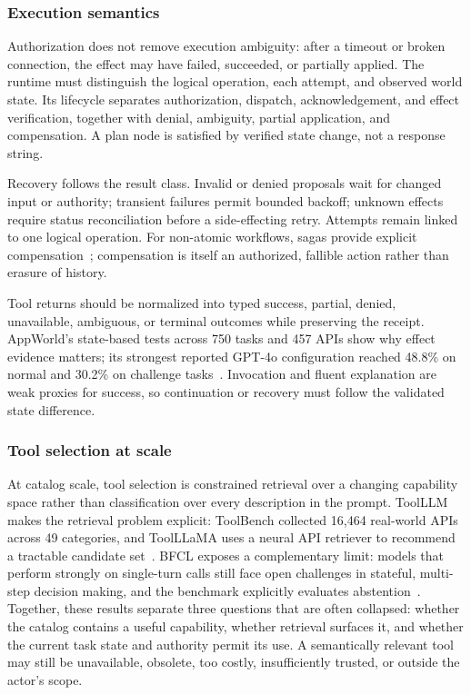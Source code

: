 \subsubsection{Execution semantics}

Authorization does not remove execution ambiguity: after a timeout or broken connection, the effect may have failed, succeeded, or partially applied. The runtime must distinguish the logical operation, each attempt, and observed world state. Its lifecycle separates authorization, dispatch, acknowledgement, and effect verification, together with denial, ambiguity, partial application, and compensation. A plan node is satisfied by verified state change, not a response string.

Recovery follows the result class. Invalid or denied proposals wait for changed input or authority; transient failures permit bounded backoff; unknown effects require status reconciliation before a side-effecting retry. Attempts remain linked to one logical operation. For non-atomic workflows, sagas provide explicit compensation~\cite{garciamolina1987sagas}; compensation is itself an authorized, fallible action rather than erasure of history.

Tool returns should be normalized into typed success, partial, denied, unavailable, ambiguous, or terminal outcomes while preserving the receipt. AppWorld's state-based tests across 750 tasks and 457 APIs show why effect evidence matters; its strongest reported GPT-4o configuration reached 48.8\% on normal and 30.2\% on challenge tasks~\cite{trivedi2024appworld}. Invocation and fluent explanation are weak proxies for success, so continuation or recovery must follow the validated state difference.

\subsubsection{Tool selection at scale}

At catalog scale, tool selection is constrained retrieval over a changing capability space rather than classification over every description in the prompt. ToolLLM makes the retrieval problem explicit: ToolBench collected 16,464 real-world APIs across 49 categories, and ToolLLaMA uses a neural API retriever to recommend a tractable candidate set~\cite{qin2024toolllm}. BFCL exposes a complementary limit: models that perform strongly on single-turn calls still face open challenges in stateful, multi-step decision making, and the benchmark explicitly evaluates abstention~\cite{patil2025bfcl}. Together, these results separate three questions that are often collapsed: whether the catalog contains a useful capability, whether retrieval surfaces it, and whether the current task state and authority permit its use. A semantically relevant tool may still be unavailable, obsolete, too costly, insufficiently trusted, or outside the actor's scope.

